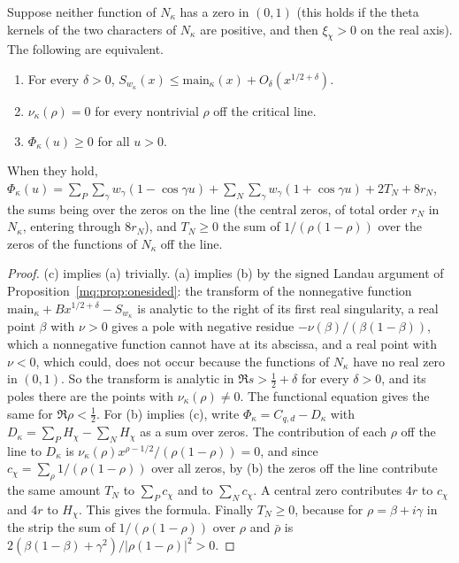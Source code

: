 \begin{theorem}\label{mqf:thm:nocaveat}
Suppose neither function of $N_\kappa$ has a zero in $(0,1)$ (this holds if the theta kernels of the two characters of $N_\kappa$ are positive, and then $\xi_\chi>0$ on the real axis). The following are equivalent.
\begin{enumerate}
\item[(a)] For every $\delta>0$, $S_{w_\kappa}(x)\le\mathrm{main}_\kappa(x)+O_\delta(x^{1/2+\delta})$.
\item[(b)] $\nu_\kappa(\rho)=0$ for every nontrivial $\rho$ off the critical line.
\item[(c)] $\Phi_\kappa(u)\ge0$ for all $u>0$.
\end{enumerate}
When they hold, $\Phi_\kappa(u)=\sum_P\sum_\gamma w_\gamma(1-\cos\gamma u)+\sum_N\sum_\gamma w_\gamma(1+\cos\gamma u)+2T_N+8r_N$, the sums being over the zeros on the line (the central zeros, of total order $r_N$ in $N_\kappa$, entering through $8r_N$), and $T_N\ge0$ the sum of $1/(\rho(1-\rho))$ over the zeros of the functions of $N_\kappa$ off the line.
\end{theorem}

\begin{proof}
(c) implies (a) trivially. (a) implies (b) by the signed Landau argument of Proposition~\ref{mq:prop:onesided}: the transform of the nonnegative function $\mathrm{main}_\kappa+Bx^{1/2+\delta}-S_{w_\kappa}$ is analytic to the right of its first real singularity, a real point $\beta$ with $\nu>0$ gives a pole with negative residue $-\nu(\beta)/(\beta(1-\beta))$, which a nonnegative function cannot have at its abscissa, and a real point with $\nu<0$, which could, does not occur because the functions of $N_\kappa$ have no real zero in $(0,1)$. So the transform is analytic in $\Re s>\frac12+\delta$ for every $\delta>0$, and its poles there are the points with $\nu_\kappa(\rho)\ne0$. The functional equation gives the same for $\Re\rho<\frac12$. For (b) implies (c), write $\Phi_\kappa=C_{q,d}-D_\kappa$ with $D_\kappa=\sum_PH_\chi-\sum_NH_\chi$ as a sum over zeros. The contribution of each $\rho$ off the line to $D_\kappa$ is $\nu_\kappa(\rho)x^{\rho-1/2}/(\rho(1-\rho))=0$, and since $c_\chi=\sum_\rho1/(\rho(1-\rho))$ over all zeros, by (b) the zeros off the line contribute the same amount $T_N$ to $\sum_Pc_\chi$ and to $\sum_Nc_\chi$. A central zero contributes $4r$ to $c_\chi$ and $4r$ to $H_\chi$. This gives the formula. Finally $T_N\ge0$, because for $\rho=\beta+i\gamma$ in the strip the sum of $1/(\rho(1-\rho))$ over $\rho$ and $\bar\rho$ is $2(\beta(1-\beta)+\gamma^2)/|\rho(1-\rho)|^2>0$.
\end{proof}

